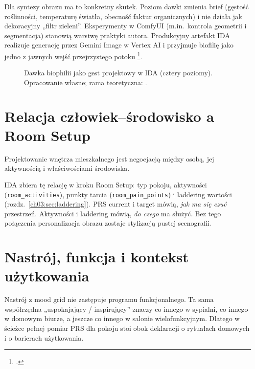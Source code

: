 Dla syntezy obrazu ma to konkretny skutek. Poziom dawki zmienia brief (gęstość roślinności, temperaturę światła, obecność faktur organicznych) i nie działa jak dekoracyjny „filtr zieleni”.
Eksperymenty w ComfyUI (m.in.\ kontrola geometrii i segmentacja) stanowią warstwę praktyki autora. Produkcyjny artefakt IDA realizuje generację przez Gemini Image w Vertex AI i przyjmuje biofilię jako jedno z jawnych wejść przejrzystego potoku \footcite{idaPlatform2026}.

\begin{figure}[htbp]
  \centering
  \caption[Dawka biophilii jako gest projektowy w IDA (cztery poziomy). Opracowanie własne; rama teoretyczna: Kellert, Heerwagen i Mador.]{Dawka biophilii jako gest projektowy w IDA (cztery poziomy).
    Opracowanie własne; rama teoretyczna: \textcite{kellert2008biophilic}.}
  \label{fig:ch02:biophilia}
\end{figure}

\section{Relacja człowiek--środowisko a Room Setup}
\label{ch02:sec:peo}

Projektowanie wnętrza mieszkalnego jest negocjacją między osobą, jej aktywnością i właściwościami środowiska.

IDA zbiera tę relację w kroku Room Setup: typ pokoju, aktywności (\texttt{room\_activities}), punkty tarcia (\texttt{room\_pain\_points}) i laddering wartości (rozdz.~\ref{ch03:sec:laddering}).
PRS current i target mówią, \emph{jak ma się czuć} przestrzeń. Aktywności i laddering mówią, \emph{do czego} ma służyć.
Bez tego połączenia personalizacja obrazu zostaje stylizacją pustej scenografii.

\section{Nastrój, funkcja i kontekst użytkowania}
\label{ch02:sec:nastroj}

Nastrój z mood grid nie zastępuje programu funkcjonalnego.
Ta sama współrzędna „uspokajający / inspirujący” znaczy co innego w sypialni, co innego w domowym biurze, a jeszcze co innego w salonie wielofunkcyjnym.
Dlatego w ścieżce pełnej pomiar PRS dla pokoju stoi obok deklaracji o rytuałach domowych i o barierach użytkowania.

